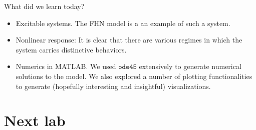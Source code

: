 \documentclass{book}
\theoremstyle{definition}
\begin{document}
What did we learn today? 
\begin{itemize}
	\item Excitable systems. The FHN model is a an example of such a system.
	\item Nonlinear response: It is clear that there are various regimes in which the system carries distinctive behaviors. 
	\item Numerics in MATLAB. We used $\texttt{ode45}$ extensively to generate numerical solutions to the model. We also explored a number of plotting functionalities to generate (hopefully interesting and insightful)  visualizations.
\end{itemize}




\newpage
 

\chapter{Next lab}
\end{document}
